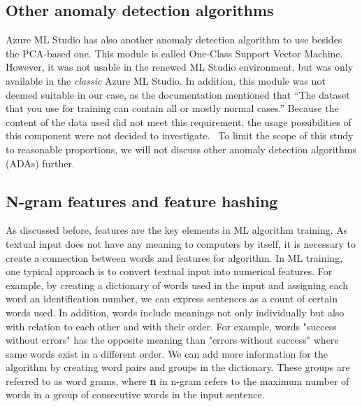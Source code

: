 
\subsection{Other anomaly detection algorithms}\label{bg-other-ada}

Azure ML Studio has
also another anomaly detection algorithm to use besides the PCA-based one.
This module is called One-Class Support Vector Machine.
However,
it was not usable in the renewed ML Studio environment,
but was only available in the \textit{classic} Azure ML Studio.
In addition,
this module was not deemed suitable in our case,
as the documentation mentioned that
\enquote{The dataset that you use for training
can contain all or mostly normal cases.}
Because the content of the data used did not meet this requirement,
the usage possibilities of this component were not decided to investigate.~\cite{azure2021oneclasssvm}
To limit the scope of this study to reasonable proportions,
we will not discuss other anomaly detection algorithms (ADAs) further.


\subsection{N-gram features and feature hashing}\label{subsec:bg-ngram-features-and-hashing}

As discussed before,
features are the key elements in ML algorithm training.
As textual input does not have any meaning to computers by itself,
it is necessary to create a connection between words and features for algorithm.
In ML training,
one typical approach is to convert textual input into numerical features.
For example, by creating a dictionary of words used in the input
and assigning each word an identification number,
we can express sentences as a count of certain words used.
In addition,
words include meanings not only individually but also
with relation to each other and with their order.
For example,
words "success without errors"
has the opposite meaning than "errors without success"
where same words exist in a different order.
We can add more information for the algorithm
by creating word pairs and groups in the dictionary.
These groups are referred to as word grams,
where \textbf{n} in n-gram refers to the maximum number of words
in a group of consecutive words in the input sentence.~\cite{furnkranz1998study}

